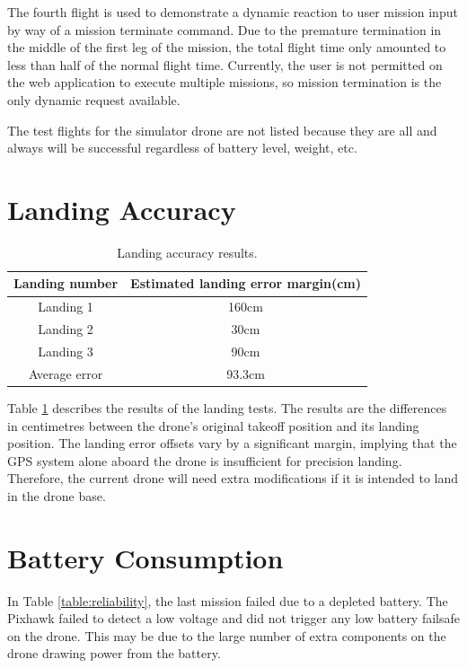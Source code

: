The fourth flight is used to demonstrate a dynamic reaction to user mission input by way of a mission terminate command. Due to the premature termination in the middle of the first leg of the mission, the total flight time only amounted to less than half of the normal flight time. Currently, the user is not permitted on the web application to execute multiple missions, so mission termination is the only dynamic request available.

The test flights for the simulator drone are not listed because they are all and always will be successful regardless of battery level, weight, etc.

\section{Landing Accuracy}\label{sect:landingaccuracy}

\begin{table}[t]
  \caption{Landing accuracy results.}
  \begin{center}
    \begin{tabular}{|c|c|}
      \hline \textbf{Landing number} & \textbf{Estimated landing error margin(cm)} \\ \hline \hline
      Landing 1 & 160cm \\ \hline
      Landing 2 & 30cm\\ \hline
      Landing 3 & 90cm\\ \hline 
      Average error & 93.3cm\\ \hline 
    \end{tabular}
  \end{center}
  \label{table:landingaccuracy}
\end{table} 
\FloatBarrier

Table \ref{table:landingaccuracy} describes the results of the landing tests. The results are the differences in centimetres between the drone's original takeoff position and its landing position. The landing error offsets vary by a significant margin, implying that the GPS system alone aboard the drone is insufficient for precision landing. Therefore, the current drone will need extra modifications if it is intended to land in the drone base.

\section{Battery Consumption}\label{sect:batterylevel}
In Table \ref{table:reliability}, the last mission failed due to a depleted battery. The Pixhawk failed to detect a low voltage and did not trigger any low battery failsafe on the drone. This may be due to the large number of extra components on the drone drawing power from the battery. 


